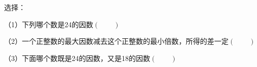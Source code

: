 选择：

（1）下列哪个数是24的因数\hfill$\left(\qquad\right)$


（2）一个正整数的最大因数减去这个正整数的最小倍数，所得的差一定\hfill$\left(\qquad\right)$


（3）下面哪个数既是24的因数，又是18的因数\hfill$\left(\qquad\right)$

